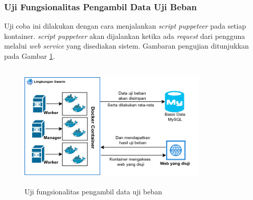 		\subsubsection{Uji Fungsionalitas Pengambil Data Uji Beban}
			Uji coba ini dilakukan dengan cara menjalankan \textit{script puppeteer} pada setiap kontainer. \textit{script puppeteer} akan dijalankan ketika ada \textit{request} dari pengguna melalui \textit{web service} yang disediakan sistem. Gambaran pengujian ditunjukkan pada Gambar \ref{ambilhasiluji}.
			\begin{figure}[H]
				\centering
				\includegraphics[width=9cm,height=6cm]{Images/C-5/ambilhasiluji.png}
				\caption{Uji fungsionalitas pengambil data uji beban}
				\label{ambilhasiluji}
			\end{figure}
		
